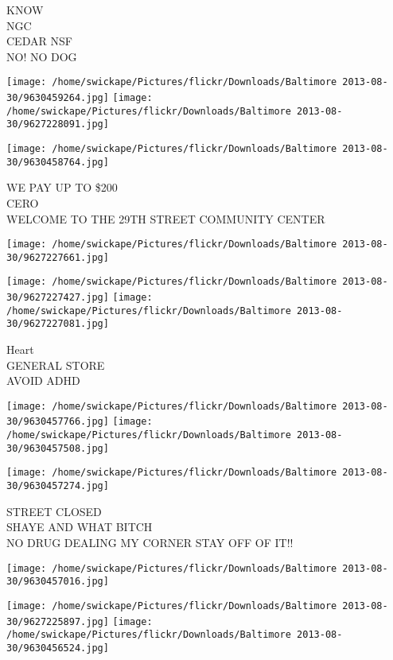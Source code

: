 \documentclass[10pt,letterpaper]{article}
\begin{document}
KNOW\\
NGC\\
CEDAR NSF\\
NO! NO DOG\\
\pagebreak

\texttt{[image: /home/swickape/Pictures/flickr/Downloads/Baltimore 2013-08-30/9630459264.jpg]}
\texttt{[image: /home/swickape/Pictures/flickr/Downloads/Baltimore 2013-08-30/9627228091.jpg]}

\vspace{0.25in}
\texttt{[image: /home/swickape/Pictures/flickr/Downloads/Baltimore 2013-08-30/9630458764.jpg]}

WE PAY UP TO \$200\\
CERO\\
WELCOME TO THE 29TH STREET COMMUNITY CENTER\\
\pagebreak

\texttt{[image: /home/swickape/Pictures/flickr/Downloads/Baltimore 2013-08-30/9627227661.jpg]}

\vspace{0.25in}
\texttt{[image: /home/swickape/Pictures/flickr/Downloads/Baltimore 2013-08-30/9627227427.jpg]}
\texttt{[image: /home/swickape/Pictures/flickr/Downloads/Baltimore 2013-08-30/9627227081.jpg]}

Heart\\
GENERAL STORE\\
AVOID ADHD\\
\pagebreak

\texttt{[image: /home/swickape/Pictures/flickr/Downloads/Baltimore 2013-08-30/9630457766.jpg]}
\texttt{[image: /home/swickape/Pictures/flickr/Downloads/Baltimore 2013-08-30/9630457508.jpg]}

\texttt{[image: /home/swickape/Pictures/flickr/Downloads/Baltimore 2013-08-30/9630457274.jpg]}

STREET CLOSED\\
SHAYE AND WHAT BITCH\\
NO DRUG DEALING MY CORNER STAY OFF OF IT!!\\
\pagebreak

\texttt{[image: /home/swickape/Pictures/flickr/Downloads/Baltimore 2013-08-30/9630457016.jpg]}

\vspace{0.25in}
\texttt{[image: /home/swickape/Pictures/flickr/Downloads/Baltimore 2013-08-30/9627225897.jpg]}
\texttt{[image: /home/swickape/Pictures/flickr/Downloads/Baltimore 2013-08-30/9630456524.jpg]}
\end{document}
